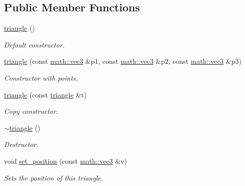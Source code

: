 \subsection*{Public Member Functions}
\begin{DoxyCompactItemize}
\item 
\mbox{\label{classphysim_1_1geom_1_1triangle_abbdfe9cc335bbcd7554986071a700e47}} 
\hyperlink{classphysim_1_1geom_1_1triangle_abbdfe9cc335bbcd7554986071a700e47}{triangle} ()
\begin{DoxyCompactList}\small\item\em Default constructor. \end{DoxyCompactList}\item 
\hyperlink{classphysim_1_1geom_1_1triangle_a230bd56c1500301a2d07042d84614372}{triangle} (const \hyperlink{structphysim_1_1math_1_1vec3}{math\+::vec3} \&p1, const \hyperlink{structphysim_1_1math_1_1vec3}{math\+::vec3} \&p2, const \hyperlink{structphysim_1_1math_1_1vec3}{math\+::vec3} \&p3)
\begin{DoxyCompactList}\small\item\em Constructor with points. \end{DoxyCompactList}\item 
\mbox{\label{classphysim_1_1geom_1_1triangle_a5abcac04006852669273884b07624ed7}} 
\hyperlink{classphysim_1_1geom_1_1triangle_a5abcac04006852669273884b07624ed7}{triangle} (const \hyperlink{classphysim_1_1geom_1_1triangle}{triangle} \&t)
\begin{DoxyCompactList}\small\item\em Copy constructor. \end{DoxyCompactList}\item 
\mbox{\label{classphysim_1_1geom_1_1triangle_a12bd1452c71a2c441a42d468f5e2e5be}} 
\hyperlink{classphysim_1_1geom_1_1triangle_a12bd1452c71a2c441a42d468f5e2e5be}{$\sim$triangle} ()
\begin{DoxyCompactList}\small\item\em Destructor. \end{DoxyCompactList}\item 
void \hyperlink{classphysim_1_1geom_1_1triangle_a796f186962d3757ebbdee9fdfdb1ecaa}{set\+\_\+position} (const \hyperlink{structphysim_1_1math_1_1vec3}{math\+::vec3} \&v)
\begin{DoxyCompactList}\small\item\em Sets the position of this triangle. \end{DoxyCompactList}\item 

\end{DoxyCompactItemize}
